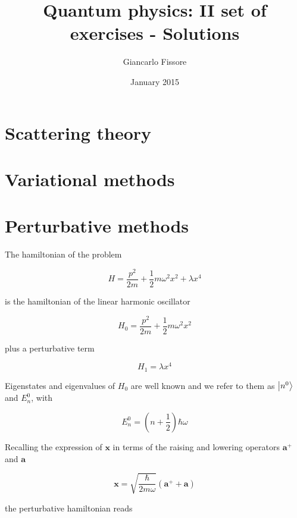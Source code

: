 \documentclass{article}
\begin{document}
\title{Quantum physics: II set of exercises - Solutions}
\author{Giancarlo Fissore}
\date{January 2015}
\maketitle

\section{Scattering theory}

\section{Variational methods}

\section{Perturbative methods}

The hamiltonian of the problem 

\begin{equation}
H = \frac{p^2}{2m} + \frac{1}{2} m \omega^2 x^2 + \lambda x^4
\end{equation}

is the hamiltonian of the linear harmonic oscillator

\begin{equation}
H_0 = \frac{p^2}{2m} + \frac{1}{2} m \omega^2 x^2
\end{equation}

plus a perturbative term

\begin{equation}
H_1 = \lambda x^4
\end{equation}

Eigenstates and eigenvalues of \( H_0 \) are well known and we refer to them as \( \ket{n^0} \) and \( E_n^0 \), with

\begin{equation}
E_n^0 = \left(n + \frac{1}{2} \right) \hbar \omega
\end{equation}

Recalling the expression of \( \bm{x} \) in terms of the raising and lowering operators \( \bm{a^+} \) and \( \bm{a} \)

\begin{equation}
\bm{x} = \sqrt{ \frac{\hbar}{2m \omega}} \left( \bm{a^+} + \bm{a} \right)
\end{equation}

the perturbative hamiltonian reads
\end{document}
